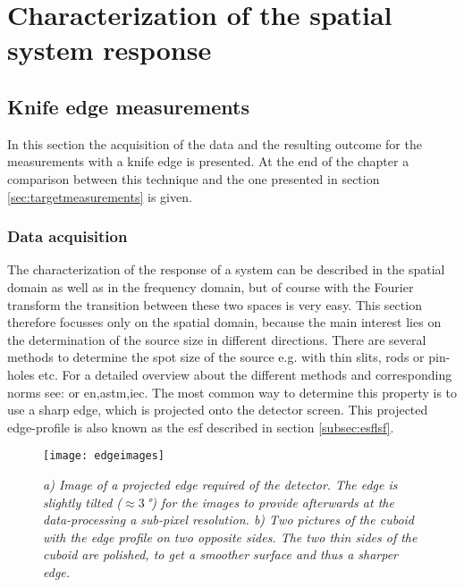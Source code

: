 \chapter[SSR characterization]{Characterization of the spatial system response}\label{chap:sysresp}
\section{Knife edge measurements}\label{sec:kedgemeasurements}
In this section the acquisition of the data and the resulting outcome for the measurements with a knife edge is presented. At the end of the chapter a comparison between this technique and the one presented in section \ref{sec:targetmeasurements} is given. 
\subsection{Data acquisition}\label{subsec:knifedata}
The characterization of the response of a system can be described in the spatial domain as well as in the frequency domain, but of course with the Fourier transform the transition between these two spaces is very easy. This section therefore focusses only on the spatial domain, because the main interest lies on the determination of the source size in different directions. There are several methods to determine the spot size of the source e.g. with thin slits, rods or pin-holes etc. For a detailed overview about the different methods and corresponding norms see: \citep{Bavendiek2012} or \acrshort{en},\acrshort{astm},\acrshort{iec}. The most common way to determine this property is to use a sharp edge, which is projected onto the detector screen. This projected edge-profile is also known as the \gls{esf} described in section \ref{subsec:esflsf}.   
\begin{figure}%
	\begin{center}
		\texttt{[image: edgeimages]}
	\end{center}
	\caption[Pictures of the knife edge and corresponding projection image]{\textit{a) Image of a projected edge required of the detector. The edge is slightly tilted ($\approx 3\,$°) for the images to provide afterwards at the data-processing a sub-pixel resolution. b) Two pictures of the cuboid with the edge profile on two opposite sides. The two thin sides of the cuboid are polished, to get a smoother surface and thus a sharper edge.}}
	\label{edgeimages}
\end{figure}
